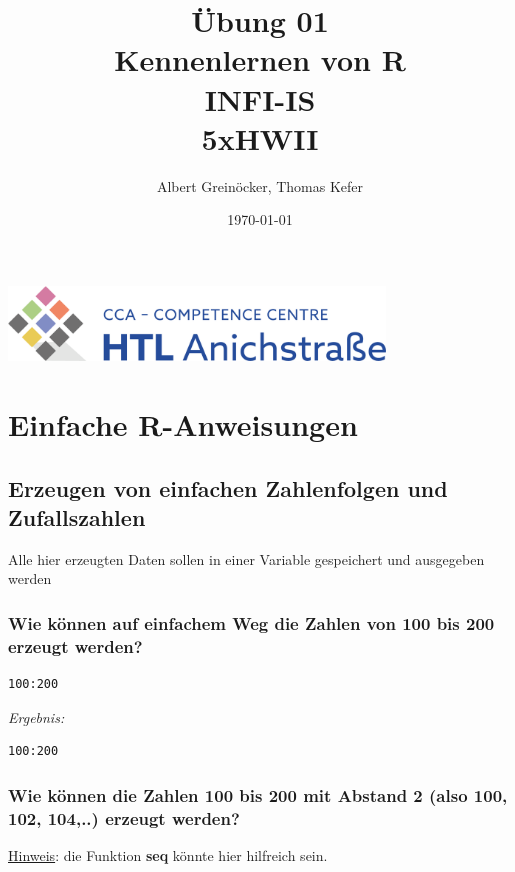 \documentclass{article}
\title{Übung 01 \\ Kennenlernen von \textbf{R} \\ INFI-IS \\ 5xHWII}
\author{Albert Greinöcker, Thomas Kefer} %
\date{\today} %
\begin{document}
\maketitle %

\begin{center}

\includegraphics[width=10cm]{../images/logo.png}
\end{center}
\vspace{1cm}

\section{Einfache R-Anweisungen}

\subsection{Erzeugen von einfachen Zahlenfolgen und Zufallszahlen}

Alle hier erzeugten Daten sollen in einer Variable gespeichert und ausgegeben werden

\subsubsection{Wie können auf einfachem Weg die Zahlen von 100 bis 200 erzeugt werden?}



\begin{lstlisting}
100:200
\end{lstlisting}

\textit{Ergebnis:}

\begin{verbatim}
100:200
\end{verbatim}


\subsubsection{Wie können die Zahlen 100 bis 200 mit Abstand 2 (also 100, 102, 104,..) erzeugt werden?}

 \underline{Hinweis}: die Funktion \textbf{seq} könnte hier hilfreich sein.
 
\end{document}
